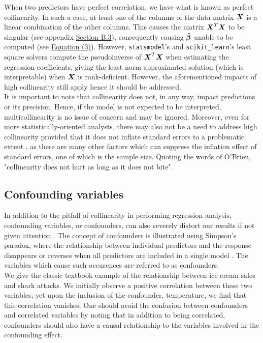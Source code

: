 \documentclass[12pt]{article}
\newcommand{\gbh}{\hat{\gb}}
\begin{document}
	When two predictors have perfect correlation, we have what is known as perfect collinearity. In such a case, at least one of the columns of the data matrix $\boldsymbol{X}$ is a linear combination of the other columns. This causes the matrix $\boldsymbol{X}^T\boldsymbol{X}$ to be singular (see appendix \hyperref[sec:append1]{Section B.3}), consequently causing $\boldsymbol{\gbh}$ unable to be computed (see \hyperref[eq3]{Equation (3)}). However, \texttt{statsmodel}'s and \texttt{scikit\_learn}'s least square solvers compute the pseudoinverse of $\boldsymbol{X}^T\boldsymbol{X}$ when estimating the regression coefficients, giving the least norm approximated solution (which is interpretable) when $\boldsymbol{X}$ is rank-deficient. However, the aforementioned impacts of high collinearity still apply hence it should be addressed.\\
	
	It is important to note that collinearity does not, in any way, impact predictions or its precision. Hence, if the model is not expected to be interpreted, multicollinearity is no issue of concern and may be ignored. Moreover, even for more statistically-oriented analysts, there may also not be a need to address high collinearity provided that it does not inflate standard errors to a problematic extent \cite{OBrien2007}, as there are many other factors which can suppress the inflation effect of standard errors, one of which is the sample size. Quoting the words of O'Brien, "collinearity does not hurt as long as it does not bite".\cite{OBrien2007}
	
	\subsection{Confounding variables}
	
	In addition to the pitfall of collinearity in performing regression analysis, confounding variables, or confounders, can also severely distort our results if not given attention \cite{Johnston2018}. The concept of confounders is illustrated using Simpson's paradox, where the relationship between individual predictors and the response disappears or reverses when all predictors are included in a single model \cite{Agresti2015}. The variables which cause such occurences are referred to as confounders.\\
	
	We give the classic textbook example of the relationship between ice cream sales and shark attacks. We initially observe a positive correlation between these two variables, yet upon the inclusion of the confounder, temperature, we find that this correlation vanishes. One should avoid the confusion between confounders and correlated variables by noting that in addition to being correlated, confounders should also have a causal relationship to the variables involved in the confounding effect.\\
	
\end{document}
